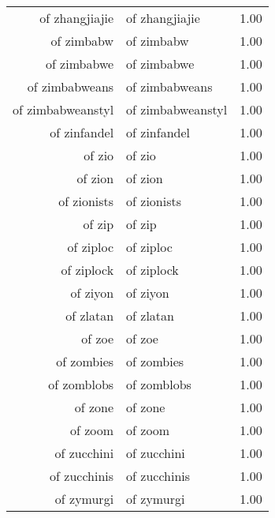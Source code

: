 \begin{table}[ht]
\begin{tabular}{rlr}
  of zhangjiajie & of zhangjiajie & 1.00 \\ 
  of zimbabw & of zimbabw & 1.00 \\ 
  of zimbabwe & of zimbabwe & 1.00 \\ 
  of zimbabweans & of zimbabweans & 1.00 \\ 
  of zimbabweanstyl & of zimbabweanstyl & 1.00 \\ 
  of zinfandel & of zinfandel & 1.00 \\ 
  of zio & of zio & 1.00 \\ 
  of zion & of zion & 1.00 \\ 
  of zionists & of zionists & 1.00 \\ 
  of zip & of zip & 1.00 \\ 
  of ziploc & of ziploc & 1.00 \\ 
  of ziplock & of ziplock & 1.00 \\ 
  of ziyon & of ziyon & 1.00 \\ 
  of zlatan & of zlatan & 1.00 \\ 
  of zoe & of zoe & 1.00 \\ 
  of zombies & of zombies & 1.00 \\ 
  of zomblobs & of zomblobs & 1.00 \\ 
  of zone & of zone & 1.00 \\ 
  of zoom & of zoom & 1.00 \\ 
  of zucchini & of zucchini & 1.00 \\ 
  of zucchinis & of zucchinis & 1.00 \\ 
  of zymurgi & of zymurgi & 1.00 \\ 
   \hline
\end{tabular}
\end{table}
